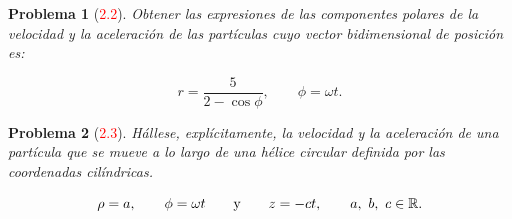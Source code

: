 \documentclass[12pt]{article}
\theoremstyle{break}
\newtheorem{exercise}{Problema}
\theoremstyle{nonumberbreak}
\begin{document}
    \begin{exercise}[\textcolor{red}{2.2}]
      Obtener las expresiones de las componentes polares de la velocidad y la aceleración de las partículas cuyo vector bidimensional de posición es:

      \begin{equation*}
        r = \dfrac{5}{2 - \cos\phi},\qquad \phi = \omega t.
      \end{equation*}
    \end{exercise}
    
    \begin{exercise}[\textcolor{red}{2.3}]
      Hállese, explícitamente, la velocidad y la aceleración de una partícula que se mueve a lo largo de una hélice circular definida por las coordenadas cilíndricas.

      \begin{equation*}
        \rho = a,\qquad \phi = \omega t\qquad \text{y} \qquad z = -ct,\qquad a,\ b,\ c \in \vecspace{R}.
      \end{equation*}
    \end{exercise}
\end{document}
